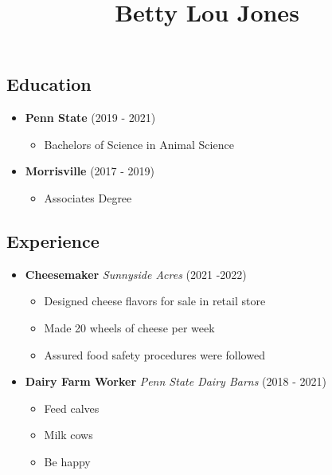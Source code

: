 \documentclass[
]{article}
\title{Betty Lou Jones}
\author{}
\date{\vspace{-2.5em}}
\providecommand{\tightlist}{%
  \setlength{\itemsep}{0pt}\setlength{\parskip}{0pt}}
\begin{document}
\maketitle

\hypertarget{education}{%
\subsection{Education}\label{education}}

\begin{itemize}
\tightlist
\item
  \textbf{Penn State} (2019 - 2021)

  \begin{itemize}
  \tightlist
  \item
    Bachelors of Science in Animal Science
  \end{itemize}
\item
  \textbf{Morrisville} (2017 - 2019)

  \begin{itemize}
  \tightlist
  \item
    Associates Degree
  \end{itemize}
\end{itemize}

\hypertarget{experience}{%
\subsection{Experience}\label{experience}}

\begin{itemize}
\tightlist
\item
  \textbf{Cheesemaker} \emph{Sunnyside Acres} (2021 -2022)

  \begin{itemize}
  \tightlist
  \item
    Designed cheese flavors for sale in retail store
  \item
    Made 20 wheels of cheese per week
  \item
    Assured food safety procedures were followed
  \end{itemize}
\item
  \textbf{Dairy Farm Worker} \emph{Penn State Dairy Barns} (2018 - 2021)

  \begin{itemize}
  \tightlist
  \item
    Feed calves
  \item
    Milk cows
  \item
    Be happy
  \end{itemize}
\end{itemize}
\end{document}

